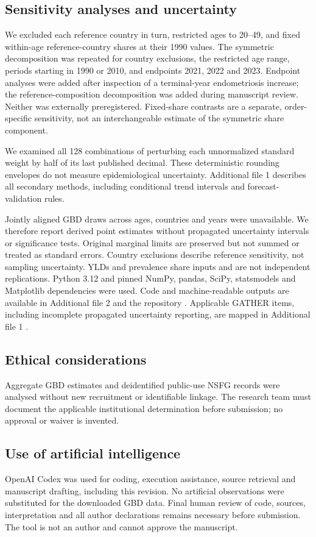 \documentclass[11pt,a4paper]{article}
\begin{document}
\subsection{Sensitivity analyses and uncertainty}
We excluded each reference country in turn, restricted ages to 20--49, and fixed within-age reference-country shares at their 1990 values. The symmetric decomposition was repeated for country exclusions, the restricted age range, periods starting in 1990 or 2010, and endpoints 2021, 2022 and 2023. Endpoint analyses were added after inspection of a terminal-year endometriosis increase; the reference-composition decomposition was added during manuscript review. Neither was externally preregistered. Fixed-share contrasts are a separate, order-specific sensitivity, not an interchangeable estimate of the symmetric share component.

We examined all 128 combinations of perturbing each unnormalized standard weight by half of its last published decimal. These deterministic rounding envelopes do not measure epidemiological uncertainty. Additional file 1 describes all secondary methods, including conditional trend intervals and forecast-validation rules.

Jointly aligned GBD draws across ages, countries and years were unavailable. We therefore report derived point estimates without propagated uncertainty intervals or significance tests. Original marginal limits are preserved but not summed or treated as standard errors. Country exclusions describe reference sensitivity, not sampling uncertainty. YLDs and prevalence share inputs and are not independent replications. Python 3.12 and pinned NumPy, pandas, SciPy, statsmodels and Matplotlib dependencies were used. Code and machine-readable outputs are available in Additional file 2 and the repository \cite{repository}. Applicable GATHER items, including incomplete propagated uncertainty reporting, are mapped in Additional file 1 \cite{gather}.


\subsection{Ethical considerations}
Aggregate GBD estimates and deidentified public-use NSFG records were analysed without new recruitment or identifiable linkage. The research team must document the applicable institutional determination before submission; no approval or waiver is invented.
\subsection{Use of artificial intelligence}
OpenAI Codex was used for coding, execution assistance, source retrieval and manuscript drafting, including this revision. No artificial observations were substituted for the downloaded GBD data. Final human review of code, sources, interpretation and all author declarations remains necessary before submission. The tool is not an author and cannot approve the manuscript.
\end{document}
